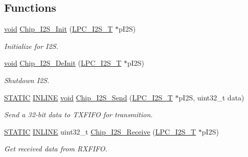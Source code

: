 \subsection*{Functions}
\begin{DoxyCompactItemize}
\item 
\hyperlink{Paradigm_2Tern__EE_2small_2portmacro_8h_a14d32f8130d3c0b212cfc751730b5b49}{void} \hyperlink{group__I2S__17XX__40XX_ga006752f0240a956ae02fba521e63c053}{Chip\-\_\-\-I2\-S\-\_\-\-Init} (\hyperlink{structLPC__I2S__T}{L\-P\-C\-\_\-\-I2\-S\-\_\-\-T} $\ast$p\-I2\-S)
\begin{DoxyCompactList}\small\item\em Initialize for I2\-S. \end{DoxyCompactList}\item 
\hyperlink{Paradigm_2Tern__EE_2small_2portmacro_8h_a14d32f8130d3c0b212cfc751730b5b49}{void} \hyperlink{group__I2S__17XX__40XX_ga2fbdb14520735214e155253f05a88a0a}{Chip\-\_\-\-I2\-S\-\_\-\-De\-Init} (\hyperlink{structLPC__I2S__T}{L\-P\-C\-\_\-\-I2\-S\-\_\-\-T} $\ast$p\-I2\-S)
\begin{DoxyCompactList}\small\item\em Shutdown I2\-S. \end{DoxyCompactList}\item 
\hyperlink{group__LPC__Types__Public__Macros_ga10b2d890d871e1489bb02b7e70d9bdfb}{S\-T\-A\-T\-I\-C} \hyperlink{group__LPC__Types__Public__Types_ga2eb6f9e0395b47b8d5e3eeae4fe0c116}{I\-N\-L\-I\-N\-E} \hyperlink{Paradigm_2Tern__EE_2small_2portmacro_8h_a14d32f8130d3c0b212cfc751730b5b49}{void} \hyperlink{group__I2S__17XX__40XX_ga7927122545d8ec1879743fb8caffb723}{Chip\-\_\-\-I2\-S\-\_\-\-Send} (\hyperlink{structLPC__I2S__T}{L\-P\-C\-\_\-\-I2\-S\-\_\-\-T} $\ast$p\-I2\-S, uint32\-\_\-t data)
\begin{DoxyCompactList}\small\item\em Send a 32-\/bit data to T\-X\-F\-I\-F\-O for transmition. \end{DoxyCompactList}\item 
\hyperlink{group__LPC__Types__Public__Macros_ga10b2d890d871e1489bb02b7e70d9bdfb}{S\-T\-A\-T\-I\-C} \hyperlink{group__LPC__Types__Public__Types_ga2eb6f9e0395b47b8d5e3eeae4fe0c116}{I\-N\-L\-I\-N\-E} uint32\-\_\-t \hyperlink{group__I2S__17XX__40XX_ga74005245ee6b79220df6a563db92a04f}{Chip\-\_\-\-I2\-S\-\_\-\-Receive} (\hyperlink{structLPC__I2S__T}{L\-P\-C\-\_\-\-I2\-S\-\_\-\-T} $\ast$p\-I2\-S)
\begin{DoxyCompactList}\small\item\em Get received data from R\-X\-F\-I\-F\-O. \end{DoxyCompactList}\item 

\end{DoxyCompactItemize}
